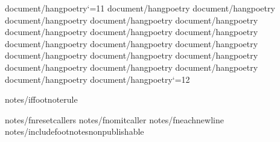 {document/hangpoetry}\catcode`\@=11
{document/hangpoetry}
{document/hangpoetry}
{document/hangpoetry}
{document/hangpoetry}
{document/hangpoetry}
{document/hangpoetry}
{document/hangpoetry}
{document/hangpoetry}
{document/hangpoetry}
{document/hangpoetry}
{document/hangpoetry}
{document/hangpoetry}
{document/hangpoetry}
{document/hangpoetry}
{document/hangpoetry}
{document/hangpoetry}
{document/hangpoetry}
{document/hangpoetry}
{document/hangpoetry}\catcode`\@=12


{notes/iffootnoterule}\def\footnoterule{{}} 

{notes/fnresetcallers}
{notes/fnomitcaller}
{notes/fneachnewline}
{notes/includefootnotes}\expandafter\def\csname f:properties\endcsname{{nonpublishable}}


